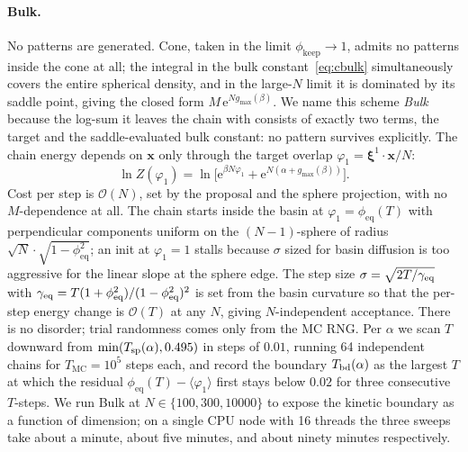 \documentclass[letterpaper]{article} %
\newcommand{\bxi}{\boldsymbol{\xi}}
\newcommand{\bx}{\bm{x}}
\newcommand{\avg}[1]{\langle #1 \rangle}
\newcommand{\e}{{\mathrm{e}}}
\newcommand{\Bnet}{\beta}
\newcommand{\phieq}{\phi_{\mathrm{eq}}}
\newcommand{\gmax}{g_{\max}}
\begin{document}
\paragraph{Bulk.}
No patterns are generated.  Cone, taken in the limit $\phi_{\mathrm{keep}}
\to 1$, admits no patterns inside the cone at all; the integral in the
bulk constant~\eqref{eq:cbulk} simultaneously covers the entire spherical
density, and in the large-$N$ limit it is dominated by its saddle point,
giving the closed form $M\,\e^{N\gmax(\Bnet)}$.  We name this scheme
\emph{Bulk} because the log-sum it leaves the chain with consists of
exactly two terms, the target and the saddle-evaluated bulk constant: no
pattern survives explicitly.  The chain energy depends on $\bx$ only
through the target overlap $\varphi_1 = \bxi^1 \cdot \bx / N$:
\begin{equation}
\ln Z(\varphi_1) = \ln\!\bigl[ \e^{\Bnet N \varphi_1}
                + \e^{N (\alpha + \gmax(\Bnet))} \bigr].
\label{eq:bulk-logZ}
\end{equation}
Cost per step is $\mathcal{O}(N)$, set by the proposal and the sphere
projection, with no $M$-dependence at all.  The chain starts inside the
basin at $\varphi_1 = \phieq(T)$ with perpendicular components uniform on
the $(N{-}1)$-sphere of radius $\sqrt N \cdot \sqrt{1 - \phieq^2}$; an
init at $\varphi_1 = 1$ stalls because $\sigma$ sized for basin diffusion
is too aggressive for the linear slope at the sphere edge.  The step
size $\sigma = \sqrt{2 T / \gamma_{\rm eq}}$ with
$\gamma_{\rm eq} = T(1 + \phieq^2)/(1 - \phieq^2)^2$ is set from the
basin curvature so that the per-step energy change is $\mathcal{O}(T)$
at any $N$, giving $N$-independent acceptance.  There is no disorder;
trial randomness comes only from the MC RNG.  Per $\alpha$ we scan $T$
downward from $\min(T_{\rm sp}(\alpha), 0.495)$ in steps of $0.01$,
running 64 independent chains for $T_{\mathrm{MC}} = 10^5$ steps each,
and record the boundary $T_{\rm bd}(\alpha)$ as the largest $T$ at which
the residual $\phieq(T) - \avg{\varphi_1}$ first stays below $0.02$ for
three consecutive $T$-steps.  We run Bulk at $N \in \{100, 300, 10000\}$
to expose the kinetic boundary as a function of dimension; on a single
CPU node with 16 threads the three sweeps take about a minute, about
five minutes, and about ninety minutes respectively.
\end{document}
